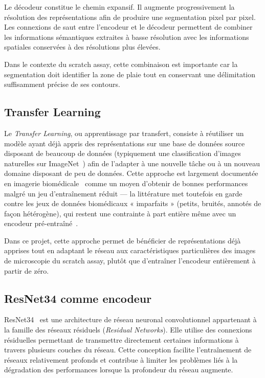 \documentclass[12pt,a4paper]{report}
\begin{document}
Le décodeur constitue le chemin expansif. Il augmente progressivement la résolution des représentations afin de produire une segmentation pixel par pixel. Les connexions de saut entre l'encodeur et le décodeur permettent de combiner les informations sémantiques extraites à basse résolution avec les informations spatiales conservées à des résolutions plus élevées.

Dans le contexte du scratch assay, cette combinaison est importante car la segmentation doit identifier la zone de plaie tout en conservant une délimitation suffisamment précise de ses contours.

\subsection{Transfer Learning}

Le \textit{Transfer Learning}, ou apprentissage par transfert, consiste à réutiliser un modèle ayant déjà appris des représentations sur une base de données source disposant de beaucoup de données (typiquement une classification d'images naturelles sur ImageNet~\cite{ref23}) afin de l'adapter à une nouvelle tâche ou à un nouveau domaine disposant de peu de données. Cette approche est largement documentée en imagerie biomédicale~\cite{ref4,ref5} comme un moyen d'obtenir de bonnes performances malgré un jeu d'entraînement réduit — la littérature met toutefois en garde contre les jeux de données biomédicaux « imparfaits » (petits, bruités, annotés de façon hétérogène), qui restent une contrainte à part entière même avec un encodeur pré-entraîné~\cite{ref5}.

Dans ce projet, cette approche permet de bénéficier de représentations déjà apprises tout en adaptant le réseau aux caractéristiques particulières des images de microscopie du scratch assay, plutôt que d'entraîner l'encodeur entièrement à partir de zéro.

\subsection{ResNet34 comme encodeur}

ResNet34~\cite{ref22} est une architecture de réseau neuronal convolutionnel appartenant à la famille des réseaux résiduels (\textit{Residual Networks}). Elle utilise des connexions résiduelles permettant de transmettre directement certaines informations à travers plusieurs couches du réseau. Cette conception facilite l'entraînement de réseaux relativement profonds et contribue à limiter les problèmes liés à la dégradation des performances lorsque la profondeur du réseau augmente.
\end{document}
